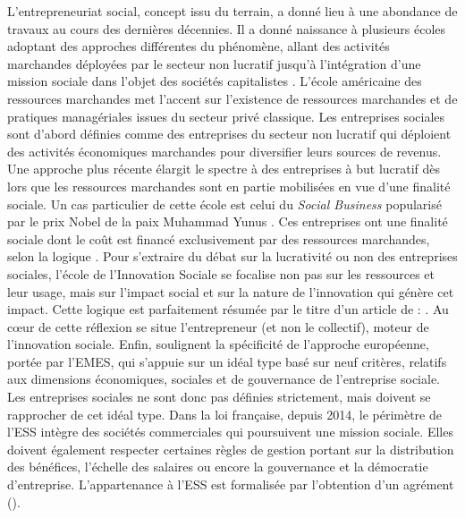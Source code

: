             L’entrepreneuriat social, concept issu du terrain, a donné lieu à une abondance de travaux au cours des dernières décennies. Il a donné naissance à plusieurs écoles adoptant des approches différentes du phénomène, allant des activités marchandes déployées par le secteur non lucratif jusqu’à l’intégration d’une mission sociale dans l’objet des sociétés capitalistes \parencite{defourny2011approches, petrella2014social}. L’école américaine des ressources marchandes met l’accent sur l’existence de ressources marchandes et de pratiques managériales issues du secteur privé classique. Les entreprises sociales sont d’abord définies comme des entreprises du secteur non lucratif qui déploient des activités économiques marchandes pour diversifier leurs sources de revenus. Une approche plus récente élargit le spectre à des entreprises à but lucratif dès lors que les ressources marchandes sont en partie mobilisées en vue d’une finalité sociale. Un cas particulier de cette école est celui du \textit{Social Business} popularisé par le prix Nobel de la paix Muhammad Yunus \parencite{yunus2010building, yunus2010building-1}. Ces entreprises ont une finalité sociale dont le coût est financé exclusivement par des ressources marchandes, selon la logique . Pour s’extraire du débat sur la lucrativité ou non des entreprises sociales,  l’école de l’Innovation Sociale se focalise non pas sur les ressources et leur usage, mais sur l’impact social et sur la nature de l’innovation qui génère cet impact. Cette logique est parfaitement résumée par le titre d’un article de \textcite{dees2003social} : . Au cœur de cette réflexion se situe l’entrepreneur (et non le collectif), moteur de l’innovation sociale. Enfin, \textcite{defourny2011approches} soulignent la spécificité de l’approche européenne, portée par l’EMES, qui s’appuie sur un idéal type basé sur neuf critères, relatifs aux dimensions économiques, sociales et de gouvernance de l’entreprise sociale. Les entreprises sociales ne sont donc pas définies strictement, mais doivent se rapprocher de cet idéal type. Dans la loi française, depuis 2014, le périmètre de l’ESS intègre des sociétés commerciales qui poursuivent une mission sociale. Elles doivent également respecter certaines règles de gestion portant sur la distribution des bénéfices, l’échelle des salaires ou encore la gouvernance et la démocratie d’entreprise. L’appartenance à l’ESS est formalisée par l’obtention d’un agrément (\esus). \\

